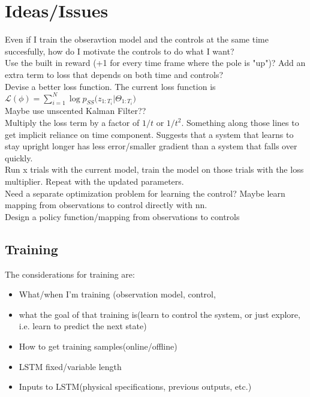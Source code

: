 \documentclass[twoside]{article}
\begin{document}
\section{Ideas/Issues}
Even if I train the obseravtion model and the controls at the same time succesfully, how do I motivate the controls to do what I want?\\

Use the built in reward (+1 for every time frame where the pole is "up")? Add an extra term to loss that depends on both time and controls?\\

Devise a better loss function. The current loss function is $\mathcal{L}(\phi)=\sum_{i=1}^{N}{\log{p_{SS}}(z_{1:T_{i}}|\Theta_{1:T_{i}}})$\\

Maybe use unscented Kalman Filter??\\

Multiply the loss term by a factor of $1/t$ or $1/t^{2}$. Something along those lines to get implicit reliance on time component. Suggests that a system that learns to stay upright longer has less error/smaller gradient than a system that falls over quickly.\\

Run x trials with the current model, train the model on those trials with the loss multiplier. Repeat with the updated parameters.\\

Need a separate optimization problem for learning the control? Maybe learn mapping from observations to control directly with nn.\\
Design a policy function/mapping from observations to controls

\subsection{Training}
The considerations for training are:
\begin{itemize}
\item What/when I'm training (observation model, control, 
\item what the goal of that training is(learn to control the system, or just explore, i.e. learn to predict the next state)
\item How to get training samples(online/offline)
\item LSTM fixed/variable length
\item Inputs to LSTM(physical specifications, previous outputs, etc.)
\end{itemize}
\end{document}
